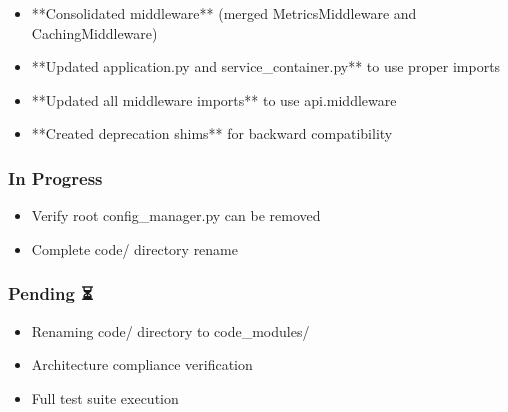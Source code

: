 \documentclass[11pt,a4paper]{article}
\begin{document}
\begin{itemize}
\item [x] **Consolidated middleware** (merged MetricsMiddleware and CachingMiddleware)
\end{itemize}

\begin{itemize}
\item [x] **Updated application.py and service_container.py** to use proper imports
\end{itemize}

\begin{itemize}
\item [x] **Updated all middleware imports** to use api.middleware
\end{itemize}

\begin{itemize}
\item [x] **Created deprecation shims** for backward compatibility
\end{itemize}

\subsubsection{In Progress 🔄}

\begin{itemize}
\item [ ] Verify root config_manager.py can be removed
\end{itemize}

\begin{itemize}
\item [ ] Complete code/ directory rename
\end{itemize}

\subsubsection{Pending ⏳}

\begin{itemize}
\item [ ] Renaming code/ directory to code_modules/
\end{itemize}

\begin{itemize}
\item [ ] Architecture compliance verification
\end{itemize}

\begin{itemize}
\item [ ] Full test suite execution
\end{itemize}
\end{document}
